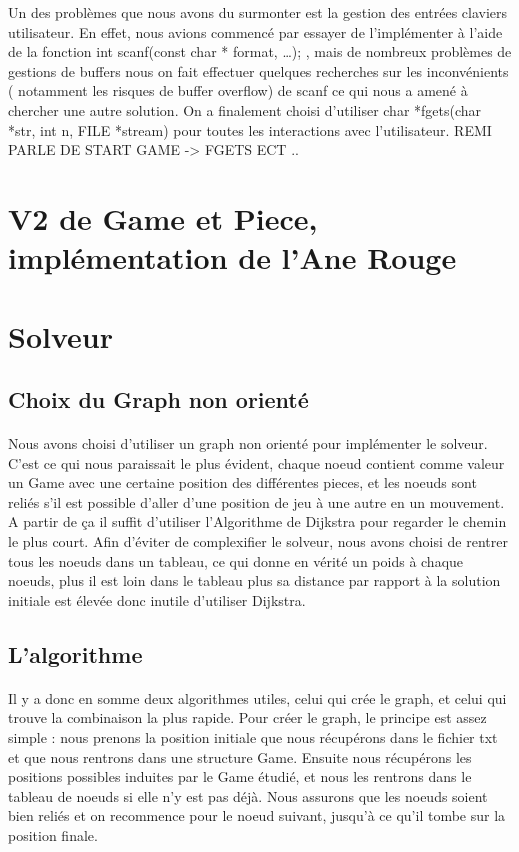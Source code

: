 \documentclass {article}
\begin{document}
Un des problèmes que nous avons du surmonter est la gestion des entrées claviers utilisateur. En effet, nous avions commencé par essayer de l'implémenter à l'aide de la fonction \og int scanf(const char * format, …); \fg{}, mais de nombreux problèmes de gestions de buffers nous on fait effectuer quelques recherches sur les inconvénients ( notamment les risques de buffer overflow)  de scanf ce qui nous a amené à chercher une autre solution. On a finalement choisi d'utiliser \og char *fgets(char *str, int n, FILE *stream) \fg{} pour toutes les interactions avec l'utilisateur.
REMI PARLE DE START GAME -> FGETS ECT .. 
\section{V2 de Game et Piece, implémentation de l'Ane Rouge}
\paragraph{}

\section{Solveur}
\subsection{Choix du Graph non orienté}
\paragraph{}
Nous avons choisi d'utiliser un graph non orienté pour implémenter le solveur. C'est ce qui nous paraissait le plus évident, chaque noeud contient comme valeur un Game avec une certaine position des différentes pieces, et les noeuds sont reliés s'il est possible d'aller d'une position de jeu à une autre en un mouvement. A partir de ça il suffit d'utiliser l'Algorithme de Dijkstra pour regarder le chemin le plus court. Afin d'éviter de complexifier le solveur, nous avons choisi de rentrer tous les noeuds dans un tableau, ce qui donne en vérité un poids à chaque noeuds, plus il est loin dans le tableau plus sa distance par rapport à la solution initiale est élevée donc inutile d'utiliser Dijkstra.

\subsection{L'algorithme}
\paragraph{}
Il y a donc en somme deux algorithmes utiles, celui qui crée le graph, et celui qui trouve la combinaison la plus rapide. Pour créer le graph, le principe est assez simple : nous prenons la position initiale que nous récupérons dans le fichier txt et que nous rentrons dans une structure Game. Ensuite nous récupérons les positions possibles induites par le Game étudié, et nous les rentrons dans le tableau de noeuds si elle n'y est pas déjà. Nous assurons que les noeuds soient bien reliés et on recommence pour le noeud suivant, jusqu'à ce qu'il tombe sur la position finale.
\end{document}
